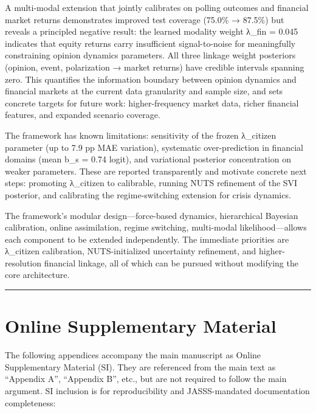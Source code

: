 \documentclass[
]{article}
\begin{document}
A multi-modal extension that jointly calibrates on polling outcomes and
financial market returns demonstrates improved test coverage (75.0\% →
87.5\%) but reveals a principled negative result: the learned modality
weight λ\_fin = 0.045 indicates that equity returns carry insufficient
signal-to-noise for meaningfully constraining opinion dynamics
parameters. All three linkage weight posteriors (opinion, event,
polarization → market returns) have credible intervals spanning zero.
This quantifies the information boundary between opinion dynamics and
financial markets at the current data granularity and sample size, and
sets concrete targets for future work: higher-frequency market data,
richer financial features, and expanded scenario coverage.

The framework has known limitations: sensitivity of the frozen
λ\_citizen parameter (up to 7.9 pp MAE variation), systematic
over-prediction in financial domains (mean \textbar b\_s\textbar{} =
0.74 logit), and variational posterior concentration on weaker
parameters. These are reported transparently and motivate concrete next
steps: promoting λ\_citizen to calibrable, running NUTS refinement of
the SVI posterior, and calibrating the regime-switching extension for
crisis dynamics.

The framework's modular design---force-based dynamics, hierarchical
Bayesian calibration, online assimilation, regime switching, multi-modal
likelihood---allows each component to be extended independently. The
immediate priorities are λ\_citizen calibration, NUTS-initialized
uncertainty refinement, and higher-resolution financial linkage, all of
which can be pursued without modifying the core architecture.

\begin{center}\rule{0.5\linewidth}{0.5pt}\end{center}


\section{Online Supplementary
Material}\label{online-supplementary-material}

The following appendices accompany the main manuscript as Online
Supplementary Material (SI). They are referenced from the main text as
``Appendix A'', ``Appendix B'', etc., but are not required to follow the
main argument. SI inclusion is for reproducibility and JASSS-mandated
documentation completeness:
\end{document}
